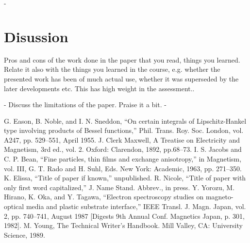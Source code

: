\documentclass[conference]{IEEEtran}
\begin{document}
- 
%
%
\section{Disussion}
Pros and cons of the work done in the paper that you read, things you learned. Relate it also with the things you learned in the course, e.g. whether the presented work has been of much actual use, whether it was superseded by the later developments etc. This has high weight in the assessment..

- Discuss the limitations of the paper. Praise it a bit.
- 

%
%
%
%
\begin{thebibliography}{00}
 G. Eason, B. Noble, and I. N. Sneddon, ``On certain integrals of Lipschitz-Hankel type involving products of Bessel functions,'' Phil. Trans. Roy. Soc. London, vol. A247, pp. 529--551, April 1955.
 J. Clerk Maxwell, A Treatise on Electricity and Magnetism, 3rd ed., vol. 2. Oxford: Clarendon, 1892, pp.68--73.
 I. S. Jacobs and C. P. Bean, ``Fine particles, thin films and exchange anisotropy,'' in Magnetism, vol. III, G. T. Rado and H. Suhl, Eds. New York: Academic, 1963, pp. 271--350.
 K. Elissa, ``Title of paper if known,'' unpublished.
 R. Nicole, ``Title of paper with only first word capitalized,'' J. Name Stand. Abbrev., in press.
 Y. Yorozu, M. Hirano, K. Oka, and Y. Tagawa, ``Electron spectroscopy studies on magneto-optical media and plastic substrate interface,'' IEEE Transl. J. Magn. Japan, vol. 2, pp. 740--741, August 1987 [Digests 9th Annual Conf. Magnetics Japan, p. 301, 1982].
 M. Young, The Technical Writer's Handbook. Mill Valley, CA: University Science, 1989.
\end{thebibliography}
\vspace{12pt}
\end{document}
